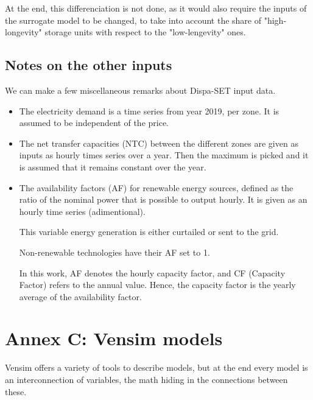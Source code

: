 At the end, this differenciation is not done, as it would also require the inputs of the surrogate model to be changed, to take into account the share of "high-longevity" storage units with respect to the "low-lengevity" ones.

\subsection{Notes on the other inputs}

We can make a few miscellaneous remarks about Dispa-SET input data.

\begin{itemize}
    \item The electricity demand is a time series from year 2019, per zone. It is assumed to be independent of the price.
    \item The net transfer capacities (NTC) between the different zones are given as inputs as hourly times series over a year. Then the maximum is picked and it is assumed that it remains constant over the year.
    \item The availability factors (AF) for renewable energy sources, defined as the ratio of the nominal power that is possible to output hourly. It is given as an hourly time series (adimentional).
    
    This variable energy generation is either curtailed or sent to the grid.

    Non-renewable technologies have their AF set to 1.

    In this work, AF denotes the hourly capacity factor, and CF (Capacity Factor) refers to the annual value. Hence, the capacity factor is the yearly average of the availability factor. 
\end{itemize}

\newpage
\section{Annex C: Vensim models}

Vensim offers a variety of tools to describe models, but at the end every model is an interconnection of variables, the math hiding in the connections between these. 


